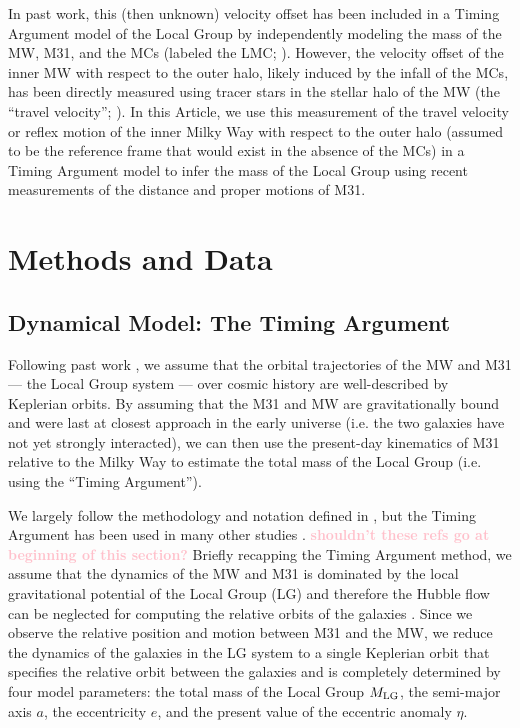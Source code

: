 \documentclass[twocolumn]{aastex631}
\newcommand{\kc}[1]{\textcolor{pink}{\textbf{#1}} }
\newcommand{\mlg}{\ensuremath{M_{\rm LG}}}
\begin{document}
In past work, this (then unknown) velocity offset has been included in a Timing
Argument model of the Local Group by independently modeling the mass of the MW,
M31, and the MCs (labeled the LMC; \citealt{Penarrubia2016}).
However, the velocity offset of the inner MW with respect to the outer halo,
likely induced by the infall of the MCs, has been directly measured using tracer
stars in the stellar halo of the MW (the ``travel velocity'';
\citealt{Petersen2021}).
In this Article, we use this measurement of the travel velocity or reflex motion
of the inner Milky Way with respect to the outer halo (assumed to be the
reference frame that would exist in the absence of the MCs) in a Timing Argument
model to infer the mass of the Local Group using recent measurements of the
distance and proper motions of M31.

\section{Methods and Data}

\subsection{Dynamical Model: The Timing Argument}
\label{sec:timingarg}

Following past work \citep[e.g.,][]{Lynden-Bell:1981, vdm2012, Penarrubia2016},
we assume that the orbital trajectories of the MW and M31 --- the Local Group
system --- over cosmic history are well-described by Keplerian orbits.
By assuming that the M31 and MW are gravitationally bound and were last at
closest approach in the early universe (i.e. the two galaxies have not yet
strongly interacted), we can then use the present-day kinematics of M31 relative
to the Milky Way to estimate the total mass of the Local Group (i.e. using the
``Timing Argument'').

We largely follow the methodology and notation defined in
\citet{Penarrubia2016}, but the Timing Argument has been used in many other
studies \citep[e.g.,][]{Kahn1959, Kroeker1991,LiWhite2008,more} .
\kc{shouldn't these refs go at beginning of this section?}
Briefly recapping the Timing Argument method, we assume that the dynamics of the
MW and M31 is dominated by the local gravitational potential of the Local Group
(LG) and therefore the Hubble flow can be neglected for computing the relative
orbits of the galaxies \citep[see, e.g.,][]{Penarrubia2014}.
Since we observe the relative position and motion between M31 and the MW, we
reduce the dynamics of the galaxies in the LG system to a single Keplerian orbit
that specifies the relative orbit between the galaxies and is completely
determined by four model parameters: the total mass of the Local Group \mlg, the
semi-major axis $a$, the eccentricity $e$, and the present value of the
eccentric anomaly $\eta$.
\end{document}
